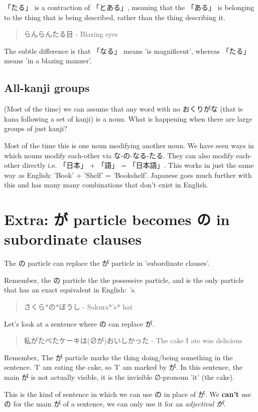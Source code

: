 \documentclass[11pt]{article}
\begin{document}
「たる」 is a contraction of 「とある」, meaning that the 「ある」 is belonging to the thing that is being described, rather than the thing describing it.
\begin{quote}
らんらんたる目 - Blazing eyes
\end{quote}
The subtle difference is that 「なる」 means 'is magnificent', whereas 「たる」 means 'in a blazing manner'.

\subsection{All-kanji groups}
\label{sec:org5451cc8}
(Most of the time) we can assume that any word with no おくりがな (that is kana following a set of kanji) is a noun. What is happening when there are large groups of just kanji?

Most of the time this is one noun modifying another noun. We have seen ways in which nouns modify each-other via な-の-なる-たる. They can also modify each-other directly i.e. 「日本」 + 「語」 = 「日本語」. This works in just the same way as English: 'Book' + 'Shelf' = 'Bookshelf'. Japanese goes much further with this and has many many combinations that don't exist in English.

\section{Extra: が particle becomes の in subordinate clauses}
\label{sec:orgff08b0b}
The の particle can replace the が particle in 'subordinate clauses'.

Remember, the の particle the the possessive particle, and is the only particle that has an exact equivalent in English: \emph{'s}.
\begin{quote}
さくら*の*ぼうし - Sakura*'s* hat
\end{quote}

Let's look at a sentence where の can replace が.
\begin{quote}
私がたべたケーキは(∅が)おいしかった - The cake I ate was delicious
\end{quote}
Remember, The が particle marks the thing doing/being something in the sentence. 'I' am eating the cake, so 'I' am marked by が. In this sentence, the main が is not actually visible, it is the invisible ∅-pronoun 'it' (the cake).

This is the kind of sentence in which we can use の in place of が. We \textbf{can't} use の for the main が of a sentence, we can only use it for an \emph{adjectival が}.
\end{document}
